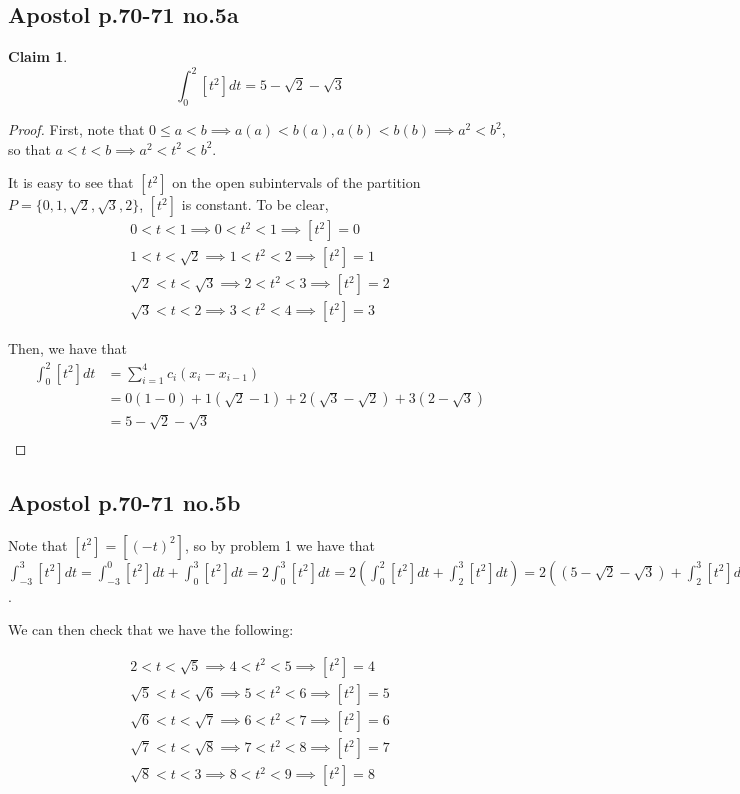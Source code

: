 \documentclass[12pt,letterpaper]{article}
\theoremstyle{definition}
\newtheorem*{claim}{Claim}
\begin{document}
\subsection*{Apostol p.70-71 no.5a}

\begin{claim}
  $$\int_0^2[t^2]dt = 5 - \sqrt{2} - \sqrt{3}$$
\end{claim}

\begin{proof}
  First, note that $0 \leq a < b \implies a(a) < b(a), a(b) < b(b) \implies a^2 < b^2$,
  so that $a < t < b \implies a^2 < t^2 < b^2$.

  It is easy to see that $[t^2]$ on the open subintervals of the partition $P = \{0, 1, \sqrt{2},
  \sqrt{3}, 2\}$, $[t^2]$ is constant. To be clear,
  \begin{align*}
    0 < t < 1 \implies 0 < t^2 < 1 \implies [t^2] = 0 \\
    1 < t < \sqrt{2} \implies 1 < t^2 < 2 \implies [t^2] = 1 \\
    \sqrt{2} < t < \sqrt{3} \implies 2 < t^2 < 3 \implies [t^2] = 2 \\
    \sqrt{3} < t < 2 \implies 3 < t^2 < 4 \implies [t^2] = 3
  \end{align*}

  Then, we have that
  \begin{align*}
    \int_0^2[t^2]dt &= \sum_{i=1}^4 c_i(x_i - x_{i-1}) \\
                    &= 0(1 - 0) + 1(\sqrt{2} - 1) + 2(\sqrt{3} - \sqrt{2}) + 3(2 - \sqrt{3}) \\
                    &= 5 - \sqrt{2} - \sqrt{3} \\
  \end{align*}
\end{proof}

\subsection*{Apostol p.70-71 no.5b}

Note that $[t^2] = [(-t)^2]$, so by problem 1 we have that $\int_{-3}^3 [t^2]dt
= \int_{-3}^{0}[t^2]dt + \int_0^3[t^2]dt = 2\int_0^3[t^2]dt = 2(\int_0^2[t^2]dt
+ \int_2^3[t^2]dt) = 2((5 - \sqrt{2} -\sqrt{3}) + \int_2^3[t^2]dt)$.

We can then check that we have the following:

\begin{align*}
  2 < t < \sqrt{5} \implies 4 < t^2 < 5 \implies [t^2] = 4 \\
  \sqrt{5} < t < \sqrt{6} \implies 5 < t^2 < 6 \implies [t^2] = 5 \\
  \sqrt{6} < t < \sqrt{7} \implies 6 < t^2 < 7 \implies [t^2] = 6 \\
  \sqrt{7} < t < \sqrt{8} \implies 7 < t^2 < 8 \implies [t^2] = 7 \\
  \sqrt{8} < t < 3 \implies 8 < t^2 < 9 \implies [t^2] = 8 \\
\end{align*}
\end{document}
